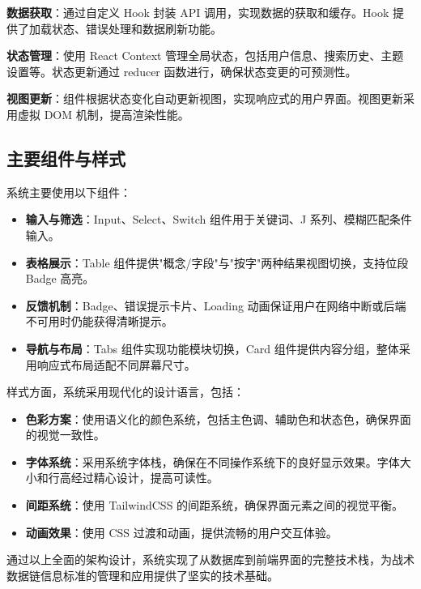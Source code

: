 \textbf{数据获取}：通过自定义 Hook 封装 API 调用，实现数据的获取和缓存。Hook 提供了加载状态、错误处理和数据刷新功能。

\textbf{状态管理}：使用 React Context 管理全局状态，包括用户信息、搜索历史、主题设置等。状态更新通过 reducer 函数进行，确保状态变更的可预测性。

\textbf{视图更新}：组件根据状态变化自动更新视图，实现响应式的用户界面。视图更新采用虚拟 DOM 机制，提高渲染性能。

\subsection{主要组件与样式}
系统主要使用以下组件：
\begin{itemize}
  \item \textbf{输入与筛选}：Input、Select、Switch 组件用于关键词、J 系列、模糊匹配条件输入。
  \item \textbf{表格展示}：Table 组件提供"概念/字段"与"按字"两种结果视图切换，支持位段 Badge 高亮。
  \item \textbf{反馈机制}：Badge、错误提示卡片、Loading 动画保证用户在网络中断或后端不可用时仍能获得清晰提示。
  \item \textbf{导航与布局}：Tabs 组件实现功能模块切换，Card 组件提供内容分组，整体采用响应式布局适配不同屏幕尺寸。
\end{itemize}

样式方面，系统采用现代化的设计语言，包括：
\begin{itemize}
  \item \textbf{色彩方案}：使用语义化的颜色系统，包括主色调、辅助色和状态色，确保界面的视觉一致性。
  \item \textbf{字体系统}：采用系统字体栈，确保在不同操作系统下的良好显示效果。字体大小和行高经过精心设计，提高可读性。
  \item \textbf{间距系统}：使用 TailwindCSS 的间距系统，确保界面元素之间的视觉平衡。
  \item \textbf{动画效果}：使用 CSS 过渡和动画，提供流畅的用户交互体验。
\end{itemize}

通过以上全面的架构设计，系统实现了从数据库到前端界面的完整技术栈，为战术数据链信息标准的管理和应用提供了坚实的技术基础。
